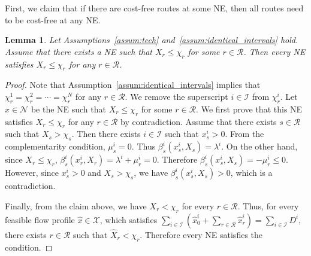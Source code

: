 \documentclass[letterpaper, 10 pt, conference]{ieeeconf}  %
\newcommand{\mc}[1]{\mathcal{#1}}
\newtheorem{lem}{Lemma}
\begin{document}
First, we claim that if there are cost-free routes at some NE, then all routes need to be cost-free at any NE.
\begin{lem}\label{lem:delay}
Let Assumptions~\ref{assum:tech} and~\ref{assum:identical_intervals} hold.
Assume that there exists a NE such that $X_r\leq\chi_r$ for some $r\in\mc{R}$.
Then every NE satisfies $X_r\leq\chi_r$ for any $r\in\mc{R}$.
\end{lem}
\begin{proof}
Note that Assumption~\ref{assum:identical_intervals} implies that $\chi^1_r=\chi^2_r=\cdots=\chi^N_r$ for any $r\in\mc{R}$.
We remove the superscript $i\in\mc{I}$ from $\chi^i_r$.
Let $x\in\mc{N}$ be the NE such that $X_r\leq\chi_r$ for some $r\in\mc{R}$.
We first prove that this NE satisfies $X_r\leq\chi_r$ for any $r\in\mc{R}$ by contradiction.
Assume that there exists $s\in\mc{R}$ such that $X_s > \chi_s$.
Then there exists $i\in\mc{I}$ such that $x^i_s>0$.
From the complementarity condition, $\mu^i_s=0$.
Thus $\beta^i_s(x^i_s,X_s)=\lambda^i$.
On the other hand, since $X_r\leq \chi_r$, $\beta^i_s(x^i_r,X_r)=\lambda^i+\mu^i_r=0$.
Therefore $\beta^i_s(x^i_s,X_s)=-\mu^i_r\leq 0$.
However, since $x^i_s>0$ and $X_s >\chi_s$, we have $\beta^i_s(x^i_s,X_s)>0$, which is a contradiction.

Finally, from the claim above, we have $X_r<\chi_r$ for every $r\in\mc{R}$.
Thus, for every feasible flow profile $\hat{x}\in\mc{X}$, which satisfies $\sum_{i\in\mc{I}}(\hat{x}^i_0+\sum_{r\in\mc{R}}\hat{x}^i_r)=\sum_{i\in\mc{I}}D^i$, there exists $r\in\mc{R}$ such that $\hat{X}_r<\chi_r$.
Therefore every NE satisfies the condition.
\end{proof}
\end{document}
